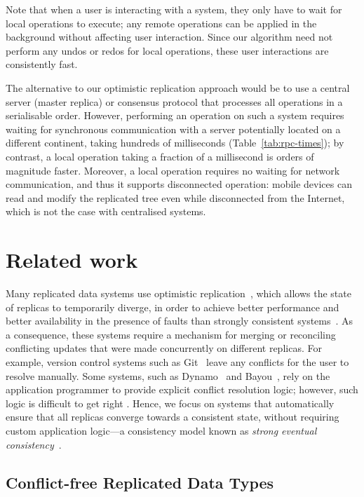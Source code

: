 \documentclass[sigconf]{acmart}
\begin{document}
Note that when a user is interacting with a system, they only have to wait for local operations to execute; any remote operations can be applied in the background without affecting user interaction.
Since our algorithm need not perform any undos or redos for local operations, these user interactions are consistently fast.

The alternative to our optimistic replication approach would be to use a central server (master replica) or consensus protocol that processes all operations in a serialisable order.
However, performing an operation on such a system requires waiting for synchronous communication with a server potentially located on a different continent, taking hundreds of milliseconds (Table~\ref{tab:rpc-times}); by contrast, a local operation taking a fraction of a millisecond is orders of magnitude faster.
Moreover, a local operation requires no waiting for network communication, and thus it supports disconnected operation: mobile devices can read and modify the replicated tree even while disconnected from the Internet, which is not the case with centralised systems.

\section{Related work}\label{sec:relwork}

Many replicated data systems use optimistic replication~\cite{Saito:2005jw}, which allows the state of replicas to temporarily diverge, in order to achieve better performance and better availability in the presence of faults than strongly consistent systems~\cite{Bailis:2014th,Gilbert:2002il}.
As a consequence, these systems require a mechanism for merging or reconciling conflicting updates that were made concurrently on different replicas.
For example, version control systems such as Git~\cite{Chacon:2014kr} leave any conflicts for the user to resolve manually.
Some systems, such as Dynamo~\cite{DeCandia:2007ui} and Bayou~\cite{Terry:1995dn}, rely on the application programmer to provide explicit conflict resolution logic; however, such logic is difficult to get right \cite{Bailis:2013jc,Burckhardt:2014hy,Gomes:2017gy}.
Hence, we focus on systems that automatically ensure that all replicas converge towards a consistent state, without requiring custom application logic---a consistency model known as \emph{strong eventual consistency}~\cite{Shapiro:2011un,Gomes:2017gy}.

\subsection{Conflict-free Replicated Data Types}
\end{document}
